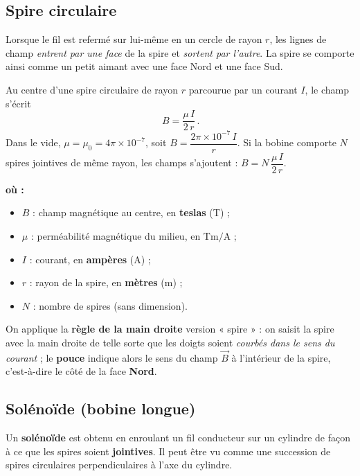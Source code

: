 \documentclass[11pt,a4paper]{article}
\newenvironment{ou}{%
  \par\smallskip\noindent\textbf{où :}\nopagebreak
  \begin{itemize}[leftmargin=1.8em,topsep=2pt,itemsep=1.5pt,parsep=0pt]}%
  {\end{itemize}}
\newcommand{\Bvec}{\vec{B}}
\begin{document}
\subsection{Spire circulaire}

Lorsque le fil est refermé sur lui-même en un cercle de rayon $r$, les lignes de champ \emph{entrent
par une face} de la spire et \emph{sortent par l'autre}. La spire se comporte ainsi comme un petit
aimant avec une face Nord et une face Sud.

\begin{formule}
Au centre d'une spire circulaire de rayon $r$ parcourue par un courant $I$, le champ s'écrit
\[ \boxed{\,B = \dfrac{\mu\, I}{2\, r}\,}. \]
Dans le vide, $\mu=\mu_0=4\pi\times 10^{-7}$, soit
$B = \dfrac{2\pi\times 10^{-7}\, I}{r}$.
Si la bobine comporte $N$ spires jointives de même rayon, les champs s'ajoutent :
$B = N\,\dfrac{\mu\, I}{2\, r}$.
\begin{ou}
  \item $B$ : champ magnétique au centre, en \textbf{teslas} (\si{\tesla}) ;
  \item $\mu$ : perméabilité magnétique du milieu, en $\si{\tesla\metre\per\ampere}$ ;
  \item $I$ : courant, en \textbf{ampères} (\si{\ampere}) ;
  \item $r$ : rayon de la spire, en \textbf{mètres} (\si{\metre}) ;
  \item $N$ : nombre de spires (sans dimension).
\end{ou}
\end{formule}

\begin{methode}[sens de $\Bvec$ dans une spire : pouce $=$ champ]
On applique la \textbf{règle de la main droite} version « spire » : on saisit la spire avec la main
droite de telle sorte que les doigts soient \emph{courbés dans le sens du courant} ; le \textbf{pouce}
indique alors le sens du champ $\Bvec$ à l'intérieur de la spire, c'est-à-dire le côté de la face
\textbf{Nord}.
\end{methode}

\subsection{Solénoïde (bobine longue)}

Un \textbf{solénoïde} est obtenu en enroulant un fil conducteur sur un cylindre de façon à ce que les
spires soient \textbf{jointives}. Il peut être vu comme une succession de spires circulaires
perpendiculaires à l'axe du cylindre.
\end{document}
